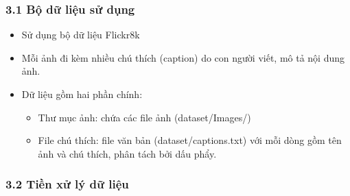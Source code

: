 \documentclass[../main.tex]{subfiles}
\begin{document}
\subsubsection*{3.1 Bộ dữ liệu sử dụng}

\begin{itemize}
    \item Sử dụng bộ dữ liệu Flickr8k
    \item Mỗi ảnh đi kèm nhiều chú thích (caption) do con người viết, mô tả nội dung ảnh.
    \item Dữ liệu gồm hai phần chính:
    \begin{itemize}
        \item Thư mục ảnh: chứa các file ảnh (dataset/Images/)
        \item File chú thích: file văn bản (dataset/captions.txt) với mỗi dòng gồm tên ảnh và chú thích, phân tách bởi dấu phẩy.
    \end{itemize}
\end{itemize}

\subsubsection*{3.2 Tiền xử lý dữ liệu}
\end{document}
